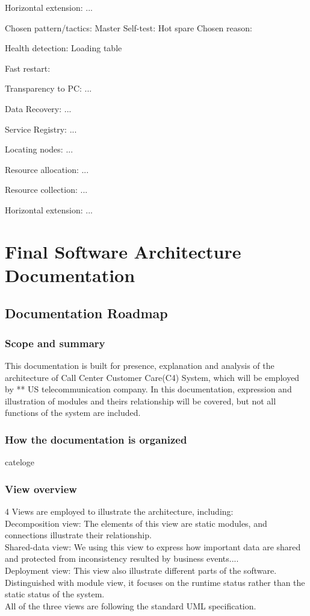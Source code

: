 \documentclass{article}
\begin{document}
		Horizontal extension:
			...

		Chosen pattern/tactics:
			Master Self-test:
				Hot spare
			Chosen reason: 

			Health detection:
				Loading table
			
			Fast restart:
				
			
			Transparency to PC:
				...
			
			Data Recovery:
				...
			
			Service Registry:
				...
			
			Locating nodes:
				... 

			Resource allocation:
				...

			Resource collection:
				... 

			Horizontal extension:
				...
		

	\section{Final Software Architecture Documentation}
	\subsection{Documentation Roadmap}
	\subsubsection{Scope and summary}
	This documentation is built for presence, explanation and analysis of the architecture of Call Center Customer Care(C4) System, which will be employed by ** US telecommunication company. In this documentation, expression and illustration of modules and theirs relationship will be covered, but not all functions of the system are included.
	\subsubsection{How the documentation is organized}
	cateloge
	\subsubsection{View overview}
	4 Views are employed to illustrate the architecture, including:\\  
	Decomposition view: The elements of this view are static modules, and connections illustrate their relationship.\\  
	Shared-data view: We using this view to express how important data are shared and protected from inconsistency resulted by business events....  \\
	Deployment view: This view also illustrate different parts of the software. Distinguished with module view, it focuses on the runtime status rather than the static status of the system.\\
	All of the three views are following the standard UML specification.
\end{document}
